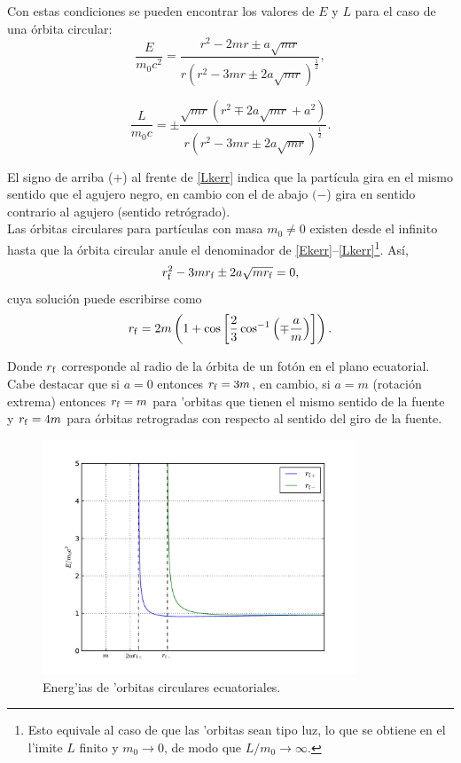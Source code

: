 Con estas condiciones se pueden encontrar los valores de $E$ y $L$ para el caso de una \'orbita circular:
\begin{equation}
\frac{E}{m_0c^2}=\frac{r^2-2mr\pm a\sqrt{mr}}{r\left(r^2-3mr\pm 2a\sqrt{mr}\right)^{\frac{1}{2}}} , \label{Ekerr}
\end{equation}

\begin{equation}
\frac{L}{m_0c}=\pm\frac{\sqrt{mr}\left(r^2\mp 2a\sqrt{mr}+a^2 \right)}{r\left(r^2-3mr\pm 2a\sqrt{mr}\right)^{\frac{1}{2}}} .\label{Lkerr} 
\end{equation}

El signo de arriba ($+$) al frente de \eqref{Lkerr} indica que la part\'icula gira en el mismo sentido que el agujero negro, en cambio con el de abajo $(-$) gira en sentido contrario al agujero (sentido retr\'ogrado).\\

Las \'orbitas circulares para part\'iculas con masa $m_0\neq 0$ existen desde el infinito hasta que la \'orbita circular anule el denominador de \eqref{Ekerr}--\eqref{Lkerr}\footnote{Esto equivale al caso de que las 'orbitas sean tipo luz, lo que se obtiene en el l'imite $L$ finito y $m_0\to 0$, de modo que $L/m_0\to\infty$.}. As\'i,
\begin{equation}
r^2_{\rm f}-3mr_{\rm f}\pm 2a\sqrt{mr_{\rm f}}=0,
\end{equation}
cuya soluci\'on puede escribirse como
\begin{equation}\label{phorbit}
r_{\rm f}=2m\left(1+\cos\left[\frac{2}{3}\cos^{-1}\left(\mp \frac{a}{m} \right) \right] \right).
\end{equation}

Donde $r_{\rm f}$ corresponde al radio de la \'orbita de un fot\'on en el plano ecuatorial. Cabe destacar que si $a=0$ entonces $r_{\rm f}=3m$, en cambio, si $a=m$ (rotaci\'on extrema) entonces $r_{\rm f}=m$ para 'orbitas que tienen el mismo sentido de la fuente y $r_{\rm f}=4m$ para \'orbitas retrogradas con respecto al sentido del giro de la fuente.\\

\begin{figure}[H]
\begin{center}
\includegraphics[height=7cm,angle=0]{fig/fig-Ecirc.pdf}
\caption{Energ'ias de 'orbitas circulares ecuatoriales.}
\label{fig:Ecirc}
\end{center}
\end{figure}

